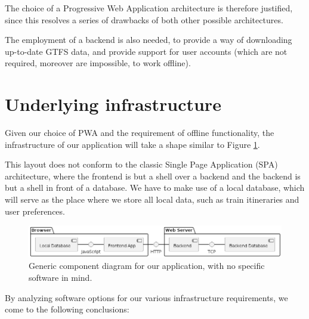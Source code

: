The choice of a Progressive Web Application architecture is therefore justified, since this resolves a series of drawbacks of both other possible architectures.

The employment of a backend is also needed, to provide a way of downloading up-to-date GTFS data, and provide support for user accounts (which are not required, moreover are impossible, to work offline).

\section{Underlying infrastructure}
\label{sec:Infrastructure}

Given our choice of PWA and the requirement of offline functionality, the infrastructure of our application will take a shape similar to Figure \ref{FigGenericComponentDiagram}.

This layout does not conform to the classic Single Page Application (SPA) architecture, where the frontend is but a shell over a backend and the backend is but a shell in front of a database. We have to make use of a local database, which will serve as the place where we store all local data, such as train itineraries and user preferences.

\begin{figure}[htbp]
    \centering
    \includegraphics[width=\textwidth]{./figures/ch3_component-diagram.png}
    \caption{Generic component diagram for our application, with no specific software in mind.}
    \label{FigGenericComponentDiagram}
\end{figure}

By analyzing software options for our various infrastructure requirements, we come to the following conclusions:

